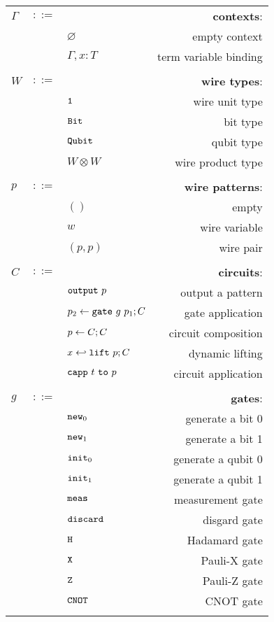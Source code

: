 \begin{longtable}[c]{lclr}
  $\Gamma$ &$::=$ &  &\textbf{contexts}: \\
      & &$\varnothing$ &empty context\\
      & &$\Gamma,x:T$ &term variable binding\\
  \\


  $W$ &$::=$ &  &\textbf{wire types}: \\
      & &$\mathtt{1}$ &wire unit type\\
      & &$\mathtt{Bit}$ &bit type \\
      & &$\mathtt{Qubit}$ &qubit type \\
      & &$W \otimes W$ &wire product type \\
  \\

  $p$ &$::=$ &  &\textbf{wire patterns}: \\
      & &$()$ &empty\\
      & &$w$ &wire variable \\
      & &$(p,p)$ &wire pair \\
  \\

  $C$ &$::=$ &  &\textbf{circuits}: \\
      & &$\toutput\ p$ &output a pattern \\
      & &$p_2 \leftarrow \mathtt{gate}\ g\ p_1 ; C$ &gate application \\
      & &$p \leftarrow C ; C$ &circuit composition \\
      & &$x \hookleftarrow \mathtt{lift}\ p ; C$ &dynamic lifting \\
      & &$\capp\ t\ \mathtt{to}\  p$ &circuit application \\
  \\

  $g$ &$::=$ &  &\textbf{gates}: \\
      & &$\mathtt{new}_0$ &generate a bit 0 \\
      & &$\mathtt{new}_1$ &generate a bit 1 \\
      & &$\mathtt{init}_0$ &generate a qubit 0 \\
      & &$\mathtt{init}_1$ &generate a qubit 1 \\
      & &$\mathtt{meas}$ &measurement gate \\
      & &$\mathtt{discard}$ &disgard gate \\
      & &$\mathtt{H}$ &Hadamard gate \\
      & &$\mathtt{X}$ &Pauli-X gate \\
      & &$\mathtt{Z}$ &Pauli-Z gate \\
      & &$\mathtt{CNOT}$ &CNOT gate \\
  \\


\end{longtable}
